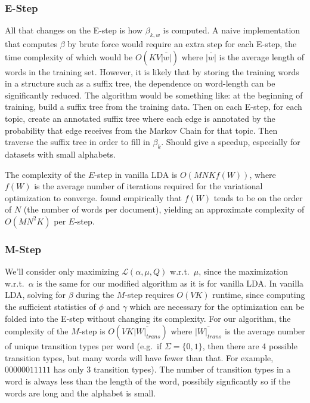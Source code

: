 \subsubsection{E-Step}
All that changes on the E-step is how $\beta_{k,w}$ is computed. A naive implementation that computes $\beta$ by brute force would require an extra step for each E-step, the time complexity of which would be $O(K V \overline{|w|})$ where $\overline{|w|}$ is the average length  of words in the training set. However, it is likely that by storing the training words in a structure such as a suffix tree, the dependence on word-length can be significantly reduced. The algorithm would be something like: at the beginning of training, build a suffix tree from the training data. Then on each E-step, for each topic, create an annotated suffix tree where each edge is annotated by the probability that edge receives from the Markov Chain for that topic. Then traverse the suffix tree in order to fill in $\beta_k$. Should give a speedup, especially for datasets with small alphabets.

The complexity of the $E$-step in vanilla LDA is $O(MNKf(W))$, where $f(W)$ is the average number of iterations required for the variational optimization to converge. \citep{blei2003latent} found empirically that $f(W)$ tends to be on the order of $N$ (the number of words per document), yielding an approximate complexity of $O(MN^2K)$ per $E$-step.

\subsubsection{M-Step}
We'll consider only maximizing $\mathcal{L}(\alpha, \mu, Q)$ w.r.t.\ $\mu$, since the maximization w.r.t.\ $\alpha$ is the same for our modified algorithm as it is for vanilla LDA. In vanilla LDA, solving for $\beta$ during the $M$-step requires $O(VK)$ runtime, since computing the sufficient statistics of $\phi$ and $\gamma$ which are necessary for the optimization can be folded into the E-step without changing its complexity. For our algorithm, the complexity of the $M$-step is $O(VK\overline{|W|_{trans}})$ where $\overline{|W|_{trans}}$ is the average number of unique transition types per word (e.g.\ if $\Sigma = \{0, 1\}$, then there are 4 possible transition types, but many words will have fewer than that. For example, $00000011111$ has only 3 transition types). The number of transition types in a word is always less than the length of the word, possibily signficantly so if the words are long and the alphabet is small.

